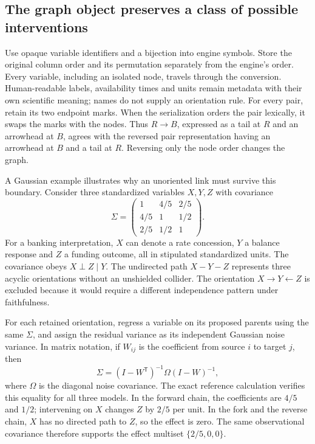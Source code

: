 \hypertarget{the-graph-object-preserves-a-class-of-possible-interventions}{%
\subsection{The graph object preserves a class of possible
interventions}\label{the-graph-object-preserves-a-class-of-possible-interventions}}

Use opaque variable identifiers and a bijection into engine symbols.
Store the original column order and its permutation separately from the
engine's order. Every variable, including an isolated node, travels
through the conversion. Human-readable labels, availability times and
units remain metadata with their own scientific meaning; names do not
supply an orientation rule. For every pair, retain its two endpoint
marks. When the serialization orders the pair lexically, it swaps the
marks with the nodes. Thus \(R\to B\), expressed as a tail at \(R\) and
an arrowhead at \(B\), agrees with the reversed pair representation
having an arrowhead at \(B\) and a tail at \(R\). Reversing only the
node order changes the graph.
\citep{exec13_java_tetrad,exec13_java_adapter_oracles}

A Gaussian example illustrates why an unoriented link must survive this
boundary. Consider three standardized variables \(X,Y,Z\) with
covariance \[
 \Sigma=\begin{pmatrix}
 1&4/5&2/5\\
 4/5&1&1/2\\
 2/5&1/2&1
 \end{pmatrix}.
\] For a banking interpretation, \(X\) can denote a rate concession,
\(Y\) a balance response and \(Z\) a funding outcome, all in stipulated
standardized units. The covariance obeys \(X\perp Z\mid Y\). The
undirected path \(X-Y-Z\) represents three acyclic orientations without
an unshielded collider. The orientation \(X\to Y\leftarrow Z\) is
excluded because it would require a different independence pattern under
faithfulness. \citep{exec13_java_adapter_oracles}

For each retained orientation, regress a variable on its proposed
parents using the same \(\Sigma\), and assign the residual variance as
its independent Gaussian noise variance. In matrix notation, if
\(W_{ij}\) is the coefficient from source \(i\) to target \(j\), then \[
 \Sigma=(I-W^{\mathsf T})^{-1}\Omega(I-W)^{-1},
\] where \(\Omega\) is the diagonal noise covariance. The exact
reference calculation verifies this equality for all three models. In
the forward chain, the coefficients are \(4/5\) and \(1/2\); intervening
on \(X\) changes \(Z\) by \(2/5\) per unit. In the fork and the reverse
chain, \(X\) has no directed path to \(Z\), so the effect is zero. The
same observational covariance therefore supports the effect multiset
\(\{2/5,0,0\}\). \citep{exec13_java_adapter_oracles}

